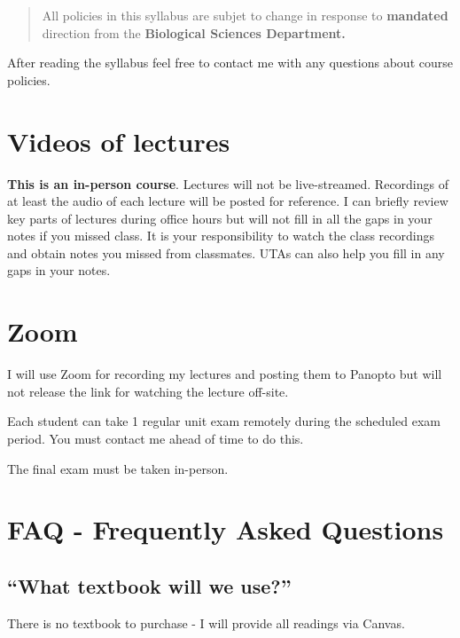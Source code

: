 \documentclass[
]{book}
\begin{document}
\begin{quote}
All policies in this syllabus are subjet to change in response to \textbf{mandated} direction from the \textbf{Biological Sciences Department.}
\end{quote}

After reading the syllabus feel free to contact me with any questions about course policies.

\hypertarget{videos-of-lectures}{%
\chapter{Videos of lectures}\label{videos-of-lectures}}

\textbf{This is an in-person course}. Lectures will not be live-streamed. Recordings of at least the audio of each lecture will be posted for reference. I can briefly review key parts of lectures during office hours but will not fill in all the gaps in your notes if you missed class. It is your responsibility to watch the class recordings and obtain notes you missed from classmates. UTAs can also help you fill in any gaps in your notes.

\hypertarget{zoom}{%
\chapter{Zoom}\label{zoom}}

I will use Zoom for recording my lectures and posting them to Panopto but will not release the link for watching the lecture off-site.

Each student can take 1 regular unit exam remotely during the scheduled exam period. You must contact me ahead of time to do this.

The final exam must be taken in-person.

\hypertarget{faq---frequently-asked-questions}{%
\chapter{FAQ - Frequently Asked Questions}\label{faq---frequently-asked-questions}}

\hypertarget{what-textbook-will-we-use}{%
\section{``What textbook will we use?''}\label{what-textbook-will-we-use}}

There is no textbook to purchase - I will provide all readings via Canvas.
\end{document}
